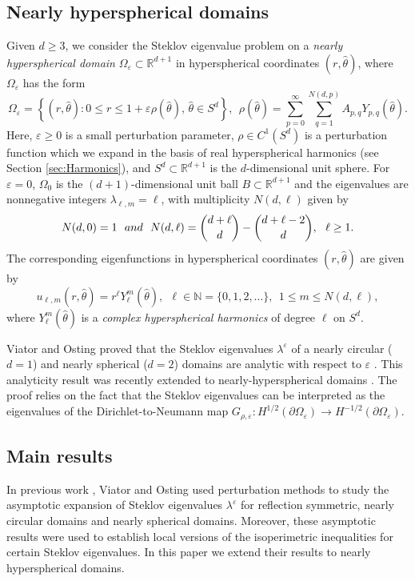 \documentclass[11pt]{amsart}
\theoremstyle{definition}
\theoremstyle{plain}
\theoremstyle{remark}
\newcommand{\R}{\mathbb{R}}
\newcommand{\N}{\mathbb{N}}
\newcommand{\vareps}{\varepsilon}
\newcommand{\del}{\partial}
\newcommand{\tn}{\textnormal}
\begin{document}
\subsection{Nearly hyperspherical domains} 
Given $d\ge 3$, we consider the Steklov eigenvalue problem on a \emph{nearly hyperspherical domain} $\Omega_\vareps\subset\R^{d + 1}$ in hyperspherical coordinates $(r, \hat\theta)$, where $\Omega_\vareps$ has the form 
\begin{equation} \label{eq:Domain} 
\Omega_\vareps = \left\{(r, \hat\theta): 0\le r\le 1+ \vareps\rho(\hat\theta), \, \hat\theta \in S^d \right\}, \ \ \rho(\hat\theta) = \sum_{p = 0}^\infty\sum_{q = 1}^{N(d, p)} A_{p, q} Y_{p, q}(\hat\theta). 
\end{equation} 
Here, $\vareps\ge 0$ is a small perturbation parameter, $\rho\in C^1(S^d)$ is a perturbation function which we expand in the basis of real hyperspherical harmonics (see Section \ref{sec:Harmonics}), and $S^d\subset\R^{d + 1}$ is the $d$-dimensional unit sphere. For $\vareps = 0$, $\Omega_0$ is the $(d + 1)$-dimensional unit ball $B\subset\R^{d + 1}$ and the eigenvalues are nonnegative integers $\lambda_{\ell, m} = \ell$, with multiplicity $N(d, \ell)$ given by 
\begin{equation} \label{eq:Steklov_multiplicity} 
N(d, 0) = 1 \ \ \tn{ and } \ \ N(d, \ell) = \binom{d + \ell}{d} - \binom{d + \ell - 2}{d}, \ \ \ell\ge 1. 
\end{equation} 
The corresponding eigenfunctions in hyperspherical coordinates $(r, \hat\theta)$ are given by 
\begin{equation*} 
u_{\ell, m}(r, \hat\theta) = r^\ell Y_\ell^m(\hat\theta), \ \ \ell\in\N = \{0, 1, 2, \dots\}, \ \ 1\le m\le N(d, \ell), 
\end{equation*} 
where $Y_\ell^m(\hat\theta)$ is a \emph{complex hyperspherical harmonics} of degree $\ell$ on $S^d$.  

Viator and Osting proved that the Steklov eigenvalues $\lambda^\vareps$ of a nearly circular ($d = 1$) and nearly spherical ($d = 2$) domains are analytic with respect to $\vareps$ \cite{viator2020}. This analyticity result was recently extended to nearly-hyperspherical domains \cite{tan2023}. The proof relies on the fact that the Steklov eigenvalues can be interpreted as the eigenvalues of the Dirichlet-to-Neumann map $G_{\rho, \vareps}\colon H^{1/2}(\del\Omega_\vareps)\to H^{-1/2}(\del\Omega_\vareps)$. 


\subsection{Main results} 
In previous work \cite{viator2018, viator2022}, Viator and Osting used perturbation methods to study the asymptotic expansion of Steklov eigenvalues $\lambda^\vareps$ for reflection symmetric, nearly circular domains and nearly spherical domains. Moreover, these asymptotic results were used to establish local versions of the isoperimetric inequalities for certain Steklov eigenvalues. In this paper we extend their results to nearly hyperspherical domains.   
\end{document}
